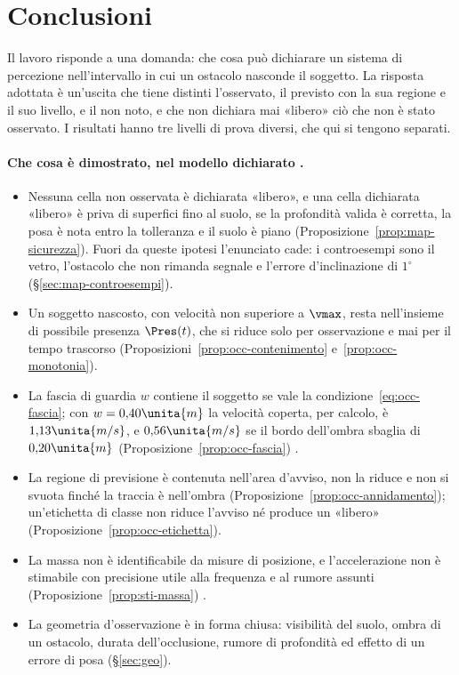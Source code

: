 \section{Conclusioni}\label{sec:con}

Il lavoro risponde a una domanda: che cosa può dichiarare un sistema di percezione nell'intervallo in cui un ostacolo nasconde il soggetto. La risposta adottata è un'uscita che tiene distinti l'osservato, il previsto con la sua regione e il suo livello, e il non noto, e che non dichiara mai «libero» ciò che non è stato osservato. I risultati hanno tre livelli di prova diversi, che qui si tengono separati.

\paragraph{Che cosa è dimostrato, nel modello dichiarato .}
\begin{itemize}
\item Nessuna cella non osservata è dichiarata «libero», e una cella dichiarata «libero» è priva di superfici fino al suolo, se la profondità valida è corretta, la posa è nota entro la tolleranza e il suolo è piano (Proposizione~\ref{prop:map-sicurezza}). Fuori da queste ipotesi l'enunciato cade: i controesempi sono il vetro, l'ostacolo che non rimanda segnale e l'errore d'inclinazione di $1^\circ$ (\S\ref{sec:map-controesempi}).
\item Un soggetto nascosto, con velocità non superiore a $\vmax$, resta nell'insieme di possibile presenza $\Pres(t)$, che si riduce solo per osservazione e mai per il tempo trascorso (Proposizioni~\ref{prop:occ-contenimento} e~\ref{prop:occ-monotonia}).
\item La fascia di guardia $w$ contiene il soggetto se vale la condizione~\eqref{eq:occ-fascia}; con $w=0{,}40\unita{m}$ la velocità coperta, per calcolo, è $1{,}13\unita{m/s}$, e $0{,}56\unita{m/s}$ se il bordo dell'ombra sbaglia di $0{,}20\unita{m}$ (Proposizione~\ref{prop:occ-fascia}) .
\item La regione di previsione è contenuta nell'area d'avviso, non la riduce e non si svuota finché la traccia è nell'ombra (Proposizione~\ref{prop:occ-annidamento}); un'etichetta di classe non riduce l'avviso né produce un «libero» (Proposizione~\ref{prop:occ-etichetta}).
\item La massa non è identificabile da misure di posizione, e l'accelerazione non è stimabile con precisione utile alla frequenza e al rumore assunti (Proposizione~\ref{prop:sti-massa}) .
\item La geometria d'osservazione è in forma chiusa: visibilità del suolo, ombra di un ostacolo, durata dell'occlusione, rumore di profondità ed effetto di un errore di posa (\S\ref{sec:geo}).
\end{itemize}

